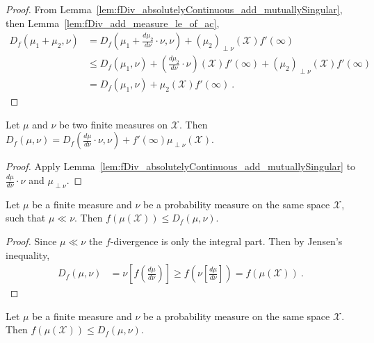 \begin{proof}
From Lemma~\ref{lem:fDiv_absolutelyContinuous_add_mutuallySingular}, then Lemma~\ref{lem:fDiv_add_measure_le_of_ac},
\begin{align*}
D_f(\mu_1 + \mu_2, \nu)
&= D_f(\mu_1 + \frac{d\mu_2}{d \nu}\cdot \nu, \nu) + (\mu_2)_{\perp\nu}(\mathcal X) f'(\infty)
\\
&\le D_f(\mu_1, \nu) + (\frac{d\mu_2}{d \nu}\cdot \nu)(\mathcal X) f'(\infty) + (\mu_2)_{\perp\nu}(\mathcal X) f'(\infty)
\\
&= D_f(\mu_1, \nu) + \mu_2(\mathcal X) f'(\infty)
\: .
\end{align*}
\end{proof}

\begin{lemma}
  \label{lem:fDiv_eq_add_withDensity_derivAtTop}
  \leanok
  Let $\mu$ and $\nu$ be two finite measures on $\mathcal X$.
  Then $D_f(\mu, \nu) = D_f(\frac{d\mu}{d\nu}\cdot \nu, \nu) + f'(\infty) \mu_{\perp \nu}(\mathcal X)$.
\end{lemma}

\begin{proof}\leanok
{}
Apply Lemma~\ref{lem:fDiv_absolutelyContinuous_add_mutuallySingular} to $\frac{d\mu}{d\nu}\cdot \nu$ and $\mu_{\perp \nu}$.
\end{proof}

\begin{lemma}
  \label{lem:le_fDiv_of_ac}
  \leanok
  Let $\mu$ be a finite measure and $\nu$ be a probability measure on the same space $\mathcal X$, such that $\mu \ll \nu$. Then $f(\mu(\mathcal X)) \le D_f(\mu, \nu)$.
\end{lemma}

\begin{proof}\leanok
Since $\mu \ll \nu$ the $f$-divergence is only the integral part. Then by Jensen's inequality,
\begin{align*}
D_f(\mu, \nu)
&= \nu\left[ f\left( \frac{d\mu}{d\nu} \right) \right]
\ge f\left( \nu\left[\frac{d\mu}{d\nu} \right] \right)
= f(\mu(\mathcal X))
\: .
\end{align*}

\end{proof}

\begin{lemma}
  \label{lem:le_fDiv}
  \leanok
  Let $\mu$ be a finite measure and $\nu$ be a probability measure on the same space $\mathcal X$. Then $f(\mu(\mathcal X)) \le D_f(\mu, \nu)$.
\end{lemma}

